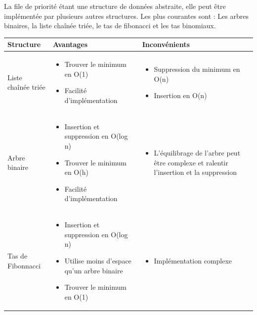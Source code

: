 \documentclass[12pt,titlepage]{report}
\begin{document}
La file de priorité étant une structure de données abstraite, elle peut être implémentée par plusieurs autres structures. Les plus courantes sont : Les arbres binaires, la liste chaînée triée, le tas de fibonacci et les tas binomiaux.
\\
\begin{center}
\begin{tabular}{|p{4cm}|p{6cm}|p{6cm}|}
\hline
\textbf{Structure} & \textbf{Avantages} & \textbf{Inconvénients} \\ 
    \hline 
        Liste chaînée triée & 
        \begin{itemize}[leftmargin=*]
            \item Trouver le minimum en O(1)
            \item Facilité d'implémentation
        \end{itemize} & 
        \begin{itemize}[leftmargin=*]
            \item Suppression du minimum en O(n)
            \item Insertion en O(n)
        \end{itemize}\\ 
    \hline
        Arbre binaire & 
        \begin{itemize}[leftmargin=*]
            \item Insertion et suppression en O(log n)
            \item Trouver le minimum en O(h)
            \item Facilité d'implémentation
        \end{itemize} &
        \begin{itemize}[leftmargin=*]
            \item L'équilibrage de l'arbre peut être complexe et ralentir l'insertion et la suppression
        \end{itemize}\\ 
    \hline
        Tas de Fibonnacci & 
        \begin{itemize}[leftmargin=*]
            \item Insertion et suppression en O(log n)
            \item Utilise moins d'espace qu'un arbre binaire
            \item Trouver le minimum en O(1)
        \end{itemize} &
        \begin{itemize}[leftmargin=*]
            \item Implémentation complexe

\end{itemize}
\end{tabular}
\end{center}
\end{document}

